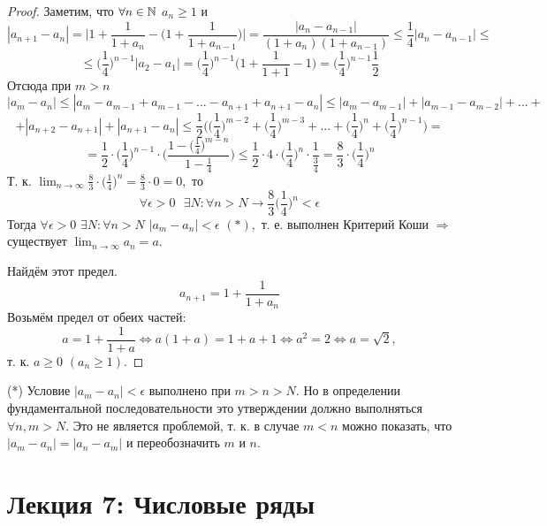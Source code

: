 	\begin{proof}
		Заметим, что $\forall n \in \mathbb N$ $a_n \geqslant 1$ и
		\[ |a_{n + 1} - a_n| = \bigg|1 + \frac{1}{1 + a_n} - \bigg(1 + \frac{1}{1 + a_{n - 1}}\bigg)\bigg| = \frac{|a_n - a_{n - 1}|}{(1 + a_n)(1 + a_{n - 1})} \leqslant \frac{1}{4}|a_n - a_{n - 1}| \leqslant \]
		\[ \leqslant \bigg(\frac{1}{4}\bigg)^{n - 1} |a_2 - a_1| = \bigg(\frac{1}{4}\bigg)^{n - 1} \bigg(1 + \frac{1}{1 + 1} - 1\bigg) = \bigg(\frac{1}{4}\bigg)^{n - 1}\frac{1}{2} \]
		Отсюда при $m > n$
		\[ |a_m - a_n| \leqslant |a_m - a_{m - 1} + a_{m - 1} - ... - a_{n + 1} + a_{n + 1} - a_n| \leqslant |a_m - a_{m - 1}| + |a_{m - 1} - a_{m - 2}| + ... + \]
		\[ + |a_{n + 2} - a_{n + 1}| + |a_{n + 1} - a_n| \leqslant \frac{1}{2}\bigg(\bigg(\frac{1}{4}\bigg)^{m - 2} + \bigg(\frac{1}{4}\bigg)^{m - 3} + ... + \bigg(\frac{1}{4}\bigg)^n + \bigg(\frac{1}{4}\bigg)^{n - 1}\bigg) = \]
		\[ = \frac{1}{2} \cdot \bigg(\frac{1}{4}\bigg)^{n - 1} \cdot \bigg(\frac{1 - \big(\frac{1}{4}\big)^{m - n}}{1 - \frac{1}{4}}\bigg) \leqslant \frac{1}{2} \cdot 4 \cdot \bigg(\frac{1}{4}\bigg)^n \cdot \frac{1}{\frac{3}{4}} = \frac{8}{3} \cdot \bigg(\frac{1}{4}\bigg)^n \]
		Т. к. $\lim_{n \to \infty} \frac{8}{3} \cdot \big(\frac{1}{4}\big)^n = \frac{8}{3} \cdot 0 = 0,$ то
		\[ \forall \epsilon > 0 \text{ } \exists N: \forall n > N \rightarrow \frac{8}{3}\bigg(\frac{1}{4}\bigg)^n < \epsilon \]
		Тогда $\forall \epsilon > 0$ $\exists N: \forall n > N$ $|a_m - a_n| < \epsilon$ $(*),$ т. е. выполнен Критерий Коши $\Rightarrow$ существует $\lim_{n \to \infty} a_n = a.$
		
		Найдём этот предел.
		\[ a_{n + 1} = 1 + \frac{1}{1 + a_n} \]
		Возьмём предел от обеих частей:
		\[ a = 1 + \frac{1}{1 + a} \Leftrightarrow a(1 + a) = 1 + a + 1 \Leftrightarrow a^2 = 2 \Leftrightarrow a = \sqrt{2}, \]
		т. к. $a \geqslant 0$ $(a_n \geqslant 1)$.
	\end{proof}
	
	\begin{explanation}
		(*) Условие $|a_m - a_n| < \epsilon$ выполнено при $m > n > N.$ Но в определении фундаментальной последовательности это утверждении должно выполняться $\forall n, m > N.$ Это не является проблемой, т. к. в случае $m < n$ можно показать, что $|a_m - a_n| = |a_n - a_m|$ и переобозначить $m$ и $n$.
	\end{explanation}
	
	\newpage
	
	\section*{Лекция 7: Числовые ряды}
	
